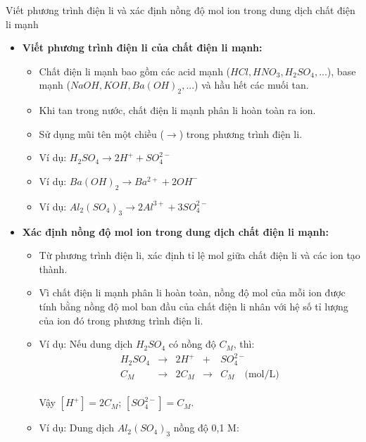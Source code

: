 \begin{dang}{Viết phương trình điện li và xác định nồng độ mol ion trong dung dịch chất điện li mạnh}\end{dang}
\begin{phuongphap}
\begin{itemize}
    \item \textbf{Viết phương trình điện li của chất điện li mạnh:}
        \begin{itemize}
	            \item Chất điện li mạnh bao gồm các acid mạnh ($HCl, HNO_3, H_2SO_4,...$), base mạnh ($NaOH, KOH, Ba(OH)_2,...$) và hầu hết các muối tan.
	            \item Khi tan trong nước, chất điện li mạnh phân li hoàn toàn ra ion.
	            \item Sử dụng mũi tên một chiều ($\rightarrow$) trong phương trình điện li.
	            \item Ví dụ: $H_2SO_4 \rightarrow 2H^+ + SO_4^{2-}$
	            \item Ví dụ: $Ba(OH)_2 \rightarrow Ba^{2+} + 2OH^-$
	            \item Ví dụ: $Al_2(SO_4)_3 \rightarrow 2Al^{3+} + 3SO_4^{2-}$
	        \end{itemize}
    \item \textbf{Xác định nồng độ mol ion trong dung dịch chất điện li mạnh:}
        \begin{itemize}
	            \item Từ phương trình điện li, xác định tỉ lệ mol giữa chất điện li và các ion tạo thành.
	            \item Vì chất điện li mạnh phân li hoàn toàn, nồng độ mol của mỗi ion được tính bằng nồng độ mol ban đầu của chất điện li nhân với hệ số tỉ lượng của ion đó trong phương trình điện li.
	            \item Ví dụ: Nếu dung dịch $H_2SO_4$ có nồng độ $C_M$, thì:
				\[
					\begin{array}{ccccl}
						H_2SO_4 & \rightarrow & 2H^+& + &SO_4^{2-} \\
						C_M & \rightarrow & 2C_M& \rightarrow& C_M \quad \text{(mol/L)}
					\end{array}
				\]
	            \\ Vậy $[H^+] = 2C_M$; $[SO_4^{2-}] = C_M$.
	            \item Ví dụ: Dung dịch $Al_2(SO_4)_3$ nồng độ 0,1 M:
				\[
				\begin{array}{ccccl}

\end{array}\]
\end{itemize}
\end{itemize}
\end{phuongphap}
